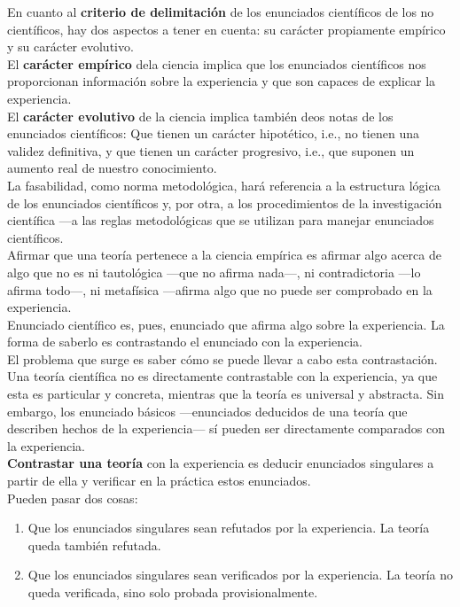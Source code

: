 \documentclass[a4paper, 11pt, twocolumn, spanish]{article}
\begin{document}
En cuanto al \textbf{criterio de delimitación} de los enunciados científicos
de los no científicos, hay dos aspectos a tener en cuenta: su carácter
propiamente empírico y su carácter evolutivo.\\[0pt]
El \textbf{carácter empírico} dela ciencia implica que los enunciados
científicos nos proporcionan información sobre la experiencia y que
son capaces de explicar la experiencia.\\[0pt]
El \textbf{carácter evolutivo} de la ciencia implica también deos notas de los
enunciados científicos: Que tienen un carácter hipotético, i.e., no
tienen una validez definitiva, y que tienen un carácter progresivo,
i.e., que suponen un aumento real de nuestro conocimiento.\\[0pt]

La fasabilidad, como norma metodológica, hará referencia a la
estructura lógica de los enunciados científicos y, por otra, a los
procedimientos de la investigación científica —a las reglas
metodológicas que se utilizan para manejar enunciados científicos. \\[0pt]
Afirmar que una teoría pertenece a la ciencia empírica es afirmar algo
acerca de algo que no es ni tautológica —que no afirma nada—, ni
contradictoria —lo afirma todo—, ni metafísica —afirma algo que no
puede ser comprobado en la experiencia.\\[0pt]
Enunciado científico es, pues, enunciado que afirma algo sobre la
experiencia. La forma de saberlo es contrastando el enunciado con la
experiencia.\\[0pt]
El problema que surge es saber cómo se puede llevar a cabo esta
contrastación.\\[0pt]

Una teoría científica no es directamente contrastable con la
experiencia, ya que esta es particular y concreta, mientras que la
teoría es universal y abstracta. Sin embargo, los enunciado básicos
—enunciados deducidos de una teoría que describen hechos de la
experiencia— sí pueden ser directamente comparados con la
experiencia.\\[0pt]
\textbf{Contrastar una teoría} con la experiencia es deducir enunciados
singulares a partir de ella y verificar en la práctica estos
enunciados. \\[0pt]
Pueden pasar dos cosas:
\begin{enumerate}
\item Que los enunciados singulares sean refutados por la
experiencia. La teoría queda también refutada.
\item Que los enunciados singulares sean verificados por la
experiencia. La teoría no queda verificada, sino solo probada
provisionalmente.
\end{enumerate}
\end{document}
